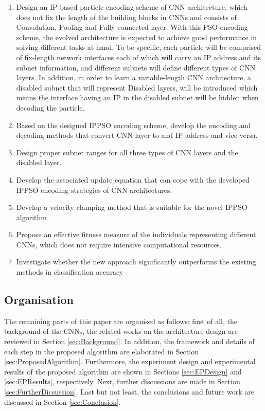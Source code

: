 \documentclass[conference]{IEEEtran}
\begin{document}
\begin{enumerate}
	\item Design an IP based particle encoding scheme of CNN architecture, which does not fix the length of the building blocks in CNNs and consists of Convolution, Pooling and Fully-connected layer. With this PSO encoding scheme, the evolved architecture is expected to achieve good performance in solving different tasks at hand. To be specific, each particle will be comprised of fix-length network interfaces each of which will carry an IP address and its subnet information, and different subnets will define different types of CNN layers. In addition, in order to learn a variable-length CNN architecture, a disabled subnet that will represent Disabled layers, will be introduced which means the interface having an IP in the disabled subnet will be hidden when decoding the particle.
	\item Based on the designed IPPSO encoding scheme, develop the encoding and decoding methods that convert CNN layer to and IP address and vice versa. 
	\item Design proper subnet ranges for all three types of CNN layers and the disabled layer.  
	\item Develop the associated update equation that can cope with the developed IPPSO encoding strategies of CNN architectures.
	\item Develop a velocity clamping method that is suitable for the novel IPPSO algorithm
	\item Propose an effective fitness measure of the individuals representing different CNNs, which does not require intensive computational resources.
	\item Investigate whether the new approach significantly outperforms the existing methods in classification accuracy
\end{enumerate} 

\subsection{Organisation}
The remaining parts of this paper are organised as follows: first of all, the background of the CNNs, the related works on the architecture design are
reviewed in Section \ref{sec:Background}. In addition, the framework and details of each step in the proposed algorithm are elaborated in Section \ref{sec:ProposedAlgorithm}. Furthermore, the experiment design and experimental results of the proposed algorithm are shown in Sections \ref{sec:EPDesign} and \ref{sec:EPResults}, respectively. Next, further discussions are made in Section \ref{sec:FurtherDicsussion}. Last but not least, the conclusions and future work are discussed in Section \ref{sec:Conclusion}.
\end{document}
